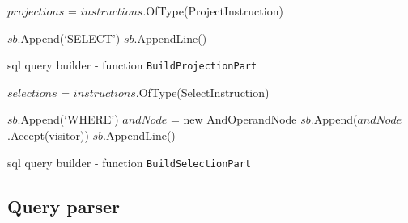 \begin{algorithm}[!htp]
    \footnotesize
    \DontPrintSemicolon

    

    $projections$ = $instructions$.OfType(ProjectInstruction)\;


    $sb$.Append(`SELECT')\;
    $sb$.AppendLine()\;
    
    \caption{\acrshort{sql}  query builder - function \texttt{BuildProjectionPart}}
    \label{alg:query_builder_buildprojection}
\end{algorithm}

\begin{algorithm}[!htp]
    \footnotesize
    \DontPrintSemicolon

    

    $selections$ = $instructions$.OfType(SelectInstruction)\;


    $sb$.Append(`WHERE')\;
    $andNode$ = new AndOperandNode\;
    $sb$.Append($andNode$.Accept(visitor))\;
    $sb$.AppendLine()\;
    \caption{\acrshort{sql}  query builder - function \texttt{BuildSelectionPart}}
    \label{alg:query_builder_build_selection}
\end{algorithm}

\subsection{Query parser}



